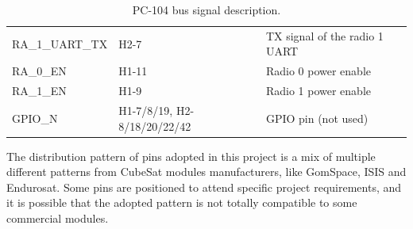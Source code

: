 \begin{table}[!h]
\begin{tabular}{lL{0.3\textwidth}l}
        RA\_1\_UART\_TX  & H2-7                             & TX signal of the radio 1 UART         \\
        RA\_0\_EN        & H1-11                            & Radio 0 power enable                  \\
        RA\_1\_EN        & H1-9                             & Radio 1 power enable                  \\
        GPIO\_N          & H1-7/8/19, H2-8/18/20/22/42      & GPIO pin (not used)                   \\
        \bottomrule[1.5pt]
    \end{tabular}
    \caption{PC-104 bus signal description.}
    \label{tab:pc104-signals}
\end{table}

The distribution pattern of pins adopted in this project is a mix of multiple different patterns from CubeSat modules manufacturers, like GomSpace, ISIS and Endurosat. Some pins are positioned to attend specific project requirements, and it is possible that the adopted pattern is not totally compatible to some commercial modules.
